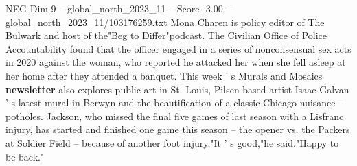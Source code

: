 \begin{textsample}{NEG Dim 9 – global\_north\_2023\_11 – Score -3.00 – global\_north\_2023\_11/103176259.txt}
Mona Charen is policy editor of The Bulwark and host of the"Beg to Differ"podcast.
The Civilian Office of Police Accountability found that the officer engaged in a series of nonconsensual sex acts in 2020 against the woman, who reported he attacked her when she fell asleep at her home after they attended a banquet.
This week ' s Murals and Mosaics \textbf{newsletter} also explores public art in St.
Louis, Pilsen-based artist Isaac Galvan ' s latest mural in Berwyn and the beautification of a classic Chicago nuisance -- potholes.
Jackson, who missed the final five games of last season with a Lisfranc injury, has started and finished one game this season -- the opener vs. the Packers at Soldier Field -- because of another foot injury."It ' s good,"he said."Happy to be back."

\end{textsample}
